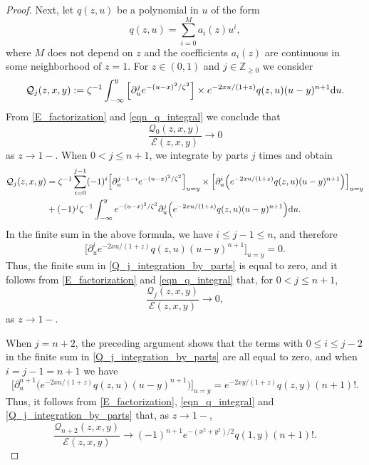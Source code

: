 \documentclass[12pt]{article}
\def\E{{\mathcal E}}
\def\d{{\textnormal d}}
\begin{document}
\begin{proof}
Next, let $q(z,u)$ be a polynomial in $u$ of the form
\begin{equation}\label{form_of_q}
q(z,u)=\sum\limits_{i=0}^M a_i(z) u^i,
\end{equation}
where $M$ does not depend on $z$ and the coefficients $a_i(z)$ are continuous in some neighborhood of $z=1$. For $z\in (0,1)$ and $j \in {\mathbb Z}_{\geqslant 0}$ we consider 
\begin{equation}\label{def_Q_j}
{\mathcal Q}_{j}(z,x,y):=\zeta^{-1} \int_{-\infty}^y \Big[\partial_u^j  
e^{-(u-x)^2/\zeta^2} \Big] \times  e^{-2xu/(1+z)} q(z,u) (u-y)^{n+1} \d u. 
\end{equation}
From \eqref{E_factorization} and \eqref{eqn_q_integral} we conclude that 
\begin{equation*}
\frac{{\mathcal Q}_{0}(z,x,y)}{\E(z,x,y)} \to 0
\end{equation*}
as $z \to 1-$. When $0< j \leqslant n+1$, we 
integrate by parts $j$ times 
and obtain 
\begin{align}\label{Q_j_integration_by_parts}
{\mathcal Q}_j(z,x,y)&= 
\zeta^{-1} \sum\limits_{i=0}^{j-1} (-1)^i \Big[\partial_u^{j-1-i}  
e^{-(u-x)^2/\zeta^2} \Big]_{u=y} \times 
\Big[\partial_u^i \Big(  
e^{-2xu/(1+z)} q(z,u) (u-y)^{n+1}\Big)\Big]_{u=y} 
\\\nonumber &+(-1)^j \zeta^{-1} \int_{-\infty}^y 
e^{-(u-x)^2/\zeta^2} 
\partial_u^j  \Big(
e^{-2xu/(1+z)} q(z,u) (u-y)^{n+1}\Big) \d u.
\end{align}
In the finite sum in the above formula, we have $i\leqslant j-1 \leqslant n$, and therefore
\[
\Big[\partial_u^i  
e^{-2xu/(1+z)} q(z,u) (u-y)^{n+1}\Big]_{u=y}=0. 
\]
Thus, the finite sum in \eqref{Q_j_integration_by_parts} is equal to zero, and
it follows from \eqref{E_factorization} and \eqref{eqn_q_integral} that, for $0<j\leqslant n+1$,
\begin{equation*}
\frac{{\mathcal Q}_{j}(z,x,y)}{\E(z,x,y)} \to 0, 
\end{equation*}
as $z \to 1-$. 

When $j=n+2$, the preceding argument shows that  the terms with $0\leqslant i \leqslant j-2$ in the finite sum in \eqref{Q_j_integration_by_parts} are all equal to zero, and when $i=j-1=n+1$ we have
\[
\Big[\partial_u^{n+1} \Big(  
e^{-2xu/(1+z)} q(z,u) (u-y)^{n+1}\Big)\Big]_{u=y}= 
e^{-2xy/(1+z)} q(z,y) (n+1)!.
\]
Thus, it follows from 
\eqref{E_factorization}, \eqref{eqn_q_integral} and 
\eqref{Q_j_integration_by_parts} that, as $z\to 1-$,
\begin{equation*}
\frac{{\mathcal Q}_{n+2}(z,x,y)}{\E(z,x,y)} \to 
 (-1)^{n+1} 
 e^{-(x^2+y^2)/2} q(1,y) (n+1)!. 
\end{equation*}



\end{proof}
\end{document}

